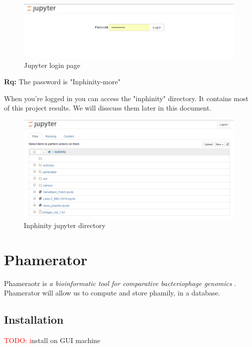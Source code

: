 \documentclass[a4paper,11pt]{report}
\newcommand{\todo}[1]{\textcolor{red}{TODO: #1}\PackageWarning{TODO:}{#1!}}
\begin{document}
\begin{figure}[H] 
	\begin{center}
		\includegraphics[scale=0.45]{img/login_jupyter}
		\caption{Jupyter login page}
	\end{center}
\end{figure}

\textbf{Rq:} The password is "Inphinity-more"

When you're logged in you can access the "inphinity" directory. It contains most of this project results. We will disscuss them later in this document.

\begin{figure}[H] 
	\begin{center}
		\includegraphics[scale=0.45]{img/inphinity_jupyter}
		\caption{Inphinity jupyter directory}
	\end{center}
\end{figure}

\section{Phamerator}
Phameraotr is \textit{a bioinformatic tool for comparative bacteriophage genomics} \cite{ref4}. Phamerator will allow us to compute and store phamily, in a database. 

\subsection{Installation}
\todo install on GUI machine
\end{document}
